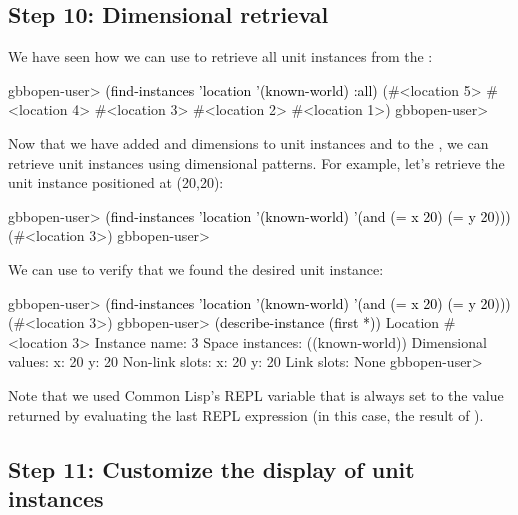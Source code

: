 \documentclass[10pt,twoside,english,pdftex]{article}
\begin{document}
\subsection*{Step 10: Dimensional retrieval}

%
%
We have seen how we can use  to retrieve all
 unit instances from the :
%
\W\supp
\begin{example}
\textcolor{darkergray}{%
  gbbopen-user> \textcolor{black}{(find-instances 'location '(known-world) :all)}
  (#<location 5> #<location 4> #<location 3> #<location 2> #<location 1>)
  gbbopen-user>}
\end{example}

Now that we have added  and  dimensions to
 unit instances and to the , we
can retrieve  unit instances using dimensional patterns.
For example, let's retrieve the unit instance positioned at (20,20):
%
\W\supp
\begin{example}
\textcolor{darkergray}{%
  gbbopen-user> \textcolor{black}{(find-instances 'location '(known-world)
                  '(and (= x 20) (= y 20)))}
   (#<location 3>)
  gbbopen-user>}
\end{example}

%
%
We can use  to verify that we found the
desired  unit instance:
%
\W\supp
\begin{example}
\textcolor{darkergray}{%
  gbbopen-user> \textcolor{black}{(find-instances 'location '(known-world)
                  '(and (= x 20) (= y 20)))}
   (#<location 3>)
  gbbopen-user> \textcolor{black}{(describe-instance (first *))}
  Location #<location 3>
    Instance name: 3
    Space instances: ((known-world))
    Dimensional values:
      x:  20
      y:  20
    Non-link slots:
      x:  20
      y:  20
    Link slots: None
  gbbopen-user>}
\end{example}
%
Note that we used Common Lisp's REPL \code{*} variable that is always set to
the value returned by evaluating the last REPL expression (in this case, the
result of ).

\subsection*{Step 11: Customize the display of  unit instances}
\end{document}
